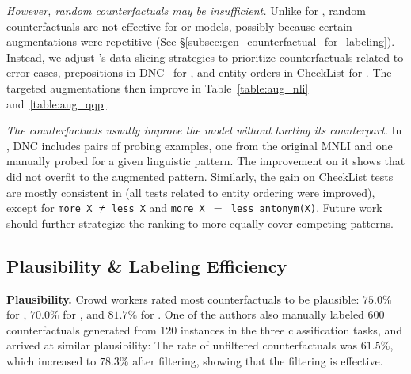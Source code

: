 \TableAugQQP


\emph{However, random counterfactuals may be insufficient.}
Unlike for \sst, random counterfactuals are not effective for \nli or \qqp models, possibly because certain augmentations were repetitive (See \S\ref{subsec:gen_counterfactual_for_labeling}).
Instead, we adjust \citet{chen2019slice}'s data slicing strategies to prioritize counterfactuals related to error cases, \eg prepositions in DNC~\cite{kim2019probing} for \nli, and entity orders in CheckList for \qqp.
The targeted augmentations then improve \maug in Table~\ref{table:aug_nli} and~\ref{table:aug_qqp}.

\emph{The counterfactuals usually improve the model without hurting its counterpart.}
In \nli, DNC includes pairs of probing examples, one from the original MNLI and one manually probed for a given linguistic pattern.
The improvement on it shows that \maug did not overfit to the augmented pattern.
Similarly, the gain on CheckList tests are mostly consistent in \qqp (\eg all tests related to entity ordering were improved), except for \texttt{more X $\not\eq$ less X} and \texttt{more X $=$ less antonym(X)}.
Future work should further strategize the ranking to more equally cover competing patterns. 




\subsection{Plausibility \& Labeling Efficiency}
\label{subsec:label_efficiency}

\textbf{Plausibility.}
Crowd workers rated most counterfactuals to be plausible: $75.0\%$ for \dsst, $70.0\%$ for \dqqp, and $81.7\%$ for \dnli.
One of the authors also manually labeled 600 counterfactuals generated from 120 instances in the three classification tasks, and arrived at similar plausibility:
The rate of unfiltered counterfactuals was $61.5\%$, which increased to $78.3\%$ after filtering, showing that the filtering is effective.

